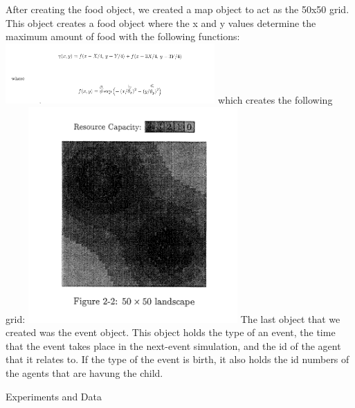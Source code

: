 \documentclass[11pt]{article}
\begin{document}
\begin{multicols}{2}
After creating the food object, we created a map object to act as the 50x50 grid. This object creates a food object where the x and y values determine the maximum amount of food with the following functions: \newline
\includegraphics[width=80mm]{MaxFoodFunction.PNG} \newline
which creates the following grid: \newline
\includegraphics[width=80mm]{ResourceCapacity.PNG} \newline
\newline
The last object that we created was the event object. This object holds the type of an event, the time that the event takes place in the next-event simulation, and the id of the agent that it relates to. If the type of the event is birth, it also holds the id numbers of the agents that are havung the child.
\newline
\newline

\center 
Experiments and Data
\flushleft


\end{multicols}
\end{document}
